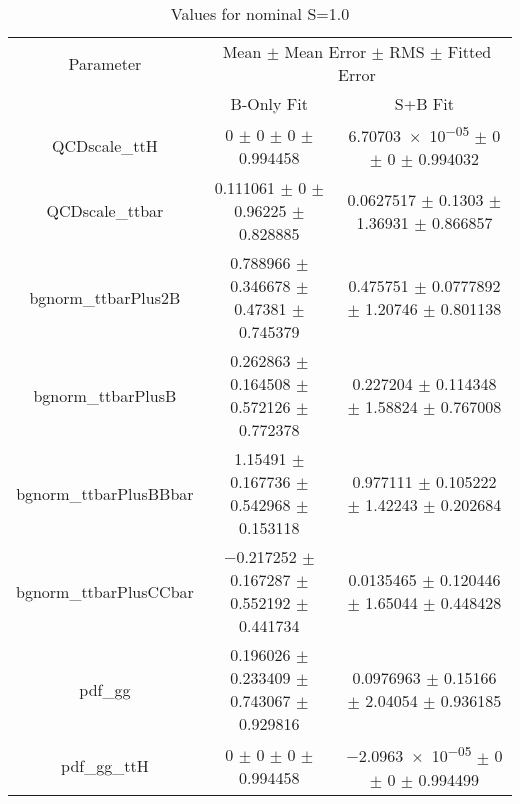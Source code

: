 \begin{table}
\centering
\caption{Values for nominal S=1.0}
\begin{tabular}{ccc}
\toprule
Parameter & \multicolumn{2}{c}{Mean $\pm$ Mean Error $\pm$ RMS $\pm$ Fitted Error}\\
 & B-Only Fit & S+B Fit\\
\midrule
QCDscale\_ttH & \num{0} $\pm$ \num{0} $\pm$ \num{0} $\pm$ \num{0.994458} & \num{6.70703e-05} $\pm$ \num{0} $\pm$ \num{0} $\pm$ \num{0.994032}\\
QCDscale\_ttbar & \num{0.111061} $\pm$ \num{0} $\pm$ \num{0.96225} $\pm$ \num{0.828885} & \num{0.0627517} $\pm$ \num{0.1303} $\pm$ \num{1.36931} $\pm$ \num{0.866857}\\
bgnorm\_ttbarPlus2B & \num{0.788966} $\pm$ \num{0.346678} $\pm$ \num{0.47381} $\pm$ \num{0.745379} & \num{0.475751} $\pm$ \num{0.0777892} $\pm$ \num{1.20746} $\pm$ \num{0.801138}\\
bgnorm\_ttbarPlusB & \num{0.262863} $\pm$ \num{0.164508} $\pm$ \num{0.572126} $\pm$ \num{0.772378} & \num{0.227204} $\pm$ \num{0.114348} $\pm$ \num{1.58824} $\pm$ \num{0.767008}\\
bgnorm\_ttbarPlusBBbar & \num{1.15491} $\pm$ \num{0.167736} $\pm$ \num{0.542968} $\pm$ \num{0.153118} & \num{0.977111} $\pm$ \num{0.105222} $\pm$ \num{1.42243} $\pm$ \num{0.202684}\\
bgnorm\_ttbarPlusCCbar & \num{-0.217252} $\pm$ \num{0.167287} $\pm$ \num{0.552192} $\pm$ \num{0.441734} & \num{0.0135465} $\pm$ \num{0.120446} $\pm$ \num{1.65044} $\pm$ \num{0.448428}\\
pdf\_gg & \num{0.196026} $\pm$ \num{0.233409} $\pm$ \num{0.743067} $\pm$ \num{0.929816} & \num{0.0976963} $\pm$ \num{0.15166} $\pm$ \num{2.04054} $\pm$ \num{0.936185}\\
pdf\_gg\_ttH & \num{0} $\pm$ \num{0} $\pm$ \num{0} $\pm$ \num{0.994458} & \num{-2.0963e-05} $\pm$ \num{0} $\pm$ \num{0} $\pm$ \num{0.994499}\\
\bottomrule
\end{tabular}
\end{table}